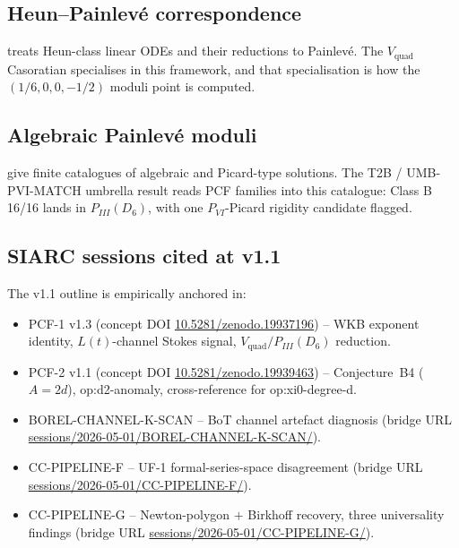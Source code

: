 \documentclass[11pt,reqno]{amsart}
\theoremstyle{plain}
\theoremstyle{definition}
\theoremstyle{remark}
\newcommand{\Lt}{L(t)}
\newcommand{\Vquad}{V_{\mathrm{quad}}}
\begin{document}
\subsection{Heun--Painlev\'e correspondence}
\cite{slavyanov2000special} treats Heun-class linear ODEs and
their reductions to Painlev\'e. The $\Vquad$ Casoratian
specialises in this framework, and that specialisation is
how the $(1/6, 0, 0, -1/2)$ moduli point is computed.

\subsection{Algebraic Painlev\'e moduli}
\cite{mazzocco2001picard, mazzocco2002painleve, iwasaki1991from,
ohyama2006studies, guzzetticlass2012} give finite catalogues
of algebraic and Picard-type solutions. The T2B /
UMB-PVI-MATCH umbrella result \cite{siarc_t2b_v3} reads PCF
families into this catalogue: Class B 16/16 lands in
$P_{III}(D_6)$, with one $P_{VI}$-Picard rigidity candidate
flagged.

\subsection{SIARC sessions cited at v1.1}
The v1.1 outline is empirically anchored in:
\begin{itemize}
\item PCF-1 v1.3 \cite{siarc_pcf1_v13} (concept DOI
\href{https://doi.org/10.5281/zenodo.19937196}{10.5281/zenodo.19937196})
-- WKB exponent identity, $\Lt$-channel Stokes signal,
$\Vquad / P_{III}(D_6)$ reduction.
\item PCF-2 v1.1 \cite{siarc_pcf2_v11} (concept DOI
\href{https://doi.org/10.5281/zenodo.19939463}{10.5281/zenodo.19939463})
-- Conjecture~B4 ($A = 2d$), \textsf{op:d2-anomaly},
cross-reference for \textsf{op:xi0-degree-d}.
\item BOREL-CHANNEL-K-SCAN \cite{siarc_borel_kscan} -- BoT
channel artefact diagnosis (bridge URL
\href{https://github.com/papanokechi/siarc-relay-bridge/tree/main/sessions/2026-05-01/BOREL-CHANNEL-K-SCAN/}{sessions/2026-05-01/BOREL-CHANNEL-K-SCAN/}).
\item CC-PIPELINE-F \cite{siarc_cc_pipeline_f} -- UF-1
formal-series-space disagreement (bridge URL
\href{https://github.com/papanokechi/siarc-relay-bridge/tree/main/sessions/2026-05-01/CC-PIPELINE-F/}{sessions/2026-05-01/CC-PIPELINE-F/}).
\item CC-PIPELINE-G \cite{siarc_cc_pipeline_g} --
Newton-polygon $+$ Birkhoff recovery, three universality
findings (bridge URL
\href{https://github.com/papanokechi/siarc-relay-bridge/tree/main/sessions/2026-05-01/CC-PIPELINE-G/}{sessions/2026-05-01/CC-PIPELINE-G/}).
\end{itemize}
\end{document}
